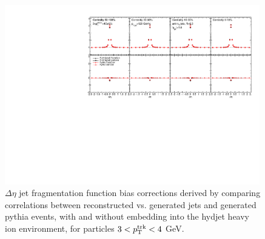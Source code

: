                       \begin{figure}[hbtp]
          \begin{center}\includegraphics[width=0.99\textwidth]{figures/JFF_SpillOver/JFF_Residual_Corrections_Eta_Inclusive_TrkPt3_TrkPt4.pdf}
          \caption[Jet fragmentation function bias corrections for particles with $3<p_{\rm T}^{\rm trk}<4$ GeV]{$\Delta\eta$ jet fragmentation function bias corrections derived by comparing correlations between reconstructed vs. generated jets and generated {\sc pythia} events, with and without embedding into the {\sc hydjet} heavy ion environment, for particles $3<p_{\rm T}^{\rm trk}<4$ GeV.}
            \label{fig:jff_residual_inclusive_trkpt3_trkpt4}
            \end{center}
            \end{figure}
            
